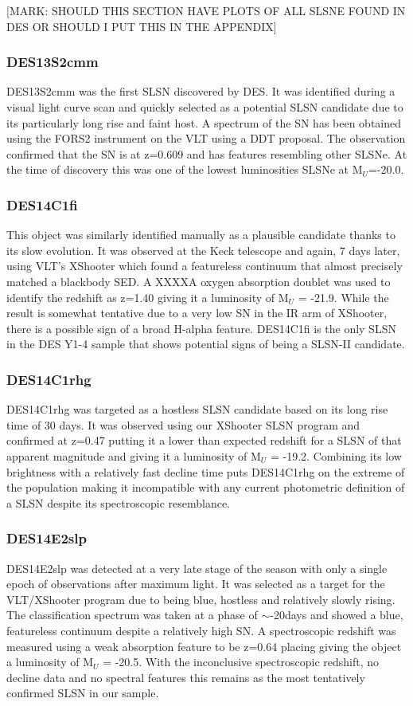 [MARK: SHOULD THIS SECTION HAVE PLOTS OF ALL SLSNE FOUND IN DES OR SHOULD I PUT THIS IN THE APPENDIX]

\subsubsection{DES13S2cmm}
DES13S2cmm was the first SLSN discovered by DES. It was identified during a visual light curve scan and quickly selected as a potential SLSN candidate due to its particularly long rise and faint host. A spectrum of the SN has been obtained using the FORS2 instrument on the VLT using a DDT proposal. The observation confirmed that the SN is at z=0.609 and has features resembling other SLSNe. At the time of discovery this was one of the lowest luminosities SLSNe at M$_U$=-20.0.

\subsubsection{DES14C1fi}
This object was similarly identified manually as a plausible candidate thanks to its slow evolution. It was observed at the Keck telescope and again, 7 days later, using VLT's XShooter which found a featureless continuum that almost precisely matched a blackbody SED. A XXXXA oxygen absorption doublet was used to identify the redshift as z=1.40 giving it a luminosity of M$_U$ = -21.9. While the result is somewhat tentative due to a very low S\/N in the IR arm of XShooter, there is a possible sign of a broad H-alpha feature. DES14C1fi is the only SLSN in the DES Y1-4 sample that shows potential signs of being a SLSN-II candidate. 

\subsubsection{DES14C1rhg}
DES14C1rhg was targeted as a hostless SLSN candidate based on its long rise time of 30 days. It was observed using our XShooter SLSN program and confirmed at z=0.47 putting it a lower than expected redshift for a SLSN of that apparent magnitude and giving it a luminosity of M$_U$ = -19.2. Combining its low brightness with a relatively fast decline time puts DES14C1rhg on the extreme of the population making it incompatible with any current photometric definition of a SLSN despite its spectroscopic resemblance. 

\subsubsection{DES14E2slp}
DES14E2slp was detected at a very late stage of the season with only a single epoch of observations after maximum light. It was selected as a target for the VLT/XShooter program due to being blue, hostless and relatively slowly rising. The classification spectrum was taken at a phase of $\sim$-20days and showed a blue, featureless continuum despite a relatively high S\/N. A spectroscopic redshift was measured using a weak absorption feature to be z=0.64 placing giving the object a luminosity of M$_U$ = -20.5. With the inconclusive spectroscopic redshift, no decline data and no spectral features this remains as the most tentatively confirmed SLSN in our sample.

